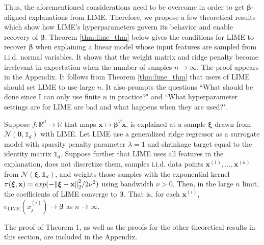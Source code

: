 \documentclass[mnsc,blindrev]{informs3}
\begin{document}
             
             Thus, the aforementioned  considerations need to be overcome in order to get $\boldsymbol{\beta}$-aligned explanations from LIME. Therefore, we propose a few theoretical results which show how LIME's hyperparameters govern its behavior and enable recovery of $\boldsymbol{\beta}$. Theorem \ref{thm:lime_thm} below gives the conditions for LIME to recover $\boldsymbol{\beta}$ when explaining a linear model whose input features are sampled from i.i.d. normal variables. It shows that the weight matrix and ridge penalty become irrelevant in expectation when the number of samples $n\rightarrow \infty$. The proof appears in the Appendix. It follows from Theorem \ref{thm:lime_thm} that users of LIME should set LIME to use large $n$. It also prompts the questions ``What should be done since I can only use finite $n$ in practice?" and ``What hyperparameter settings are for LIME are bad and what happens when they are used?". 
            \begin{theorem}
                \label{thm:lime_thm}
                Suppose $f:\mathbb{R}^d\rightarrow \mathbb{R}$ that maps $\mathbf{x} \mapsto \boldsymbol{\beta}^T \mathbf{x}$, is explained at a sample $\boldsymbol{\xi}$ drawn from $\mathcal{N}(\mathbf{0}, \mathds{1}_d)$ with LIME. Let LIME use a generalized ridge regressor as a surrogate model with sparsity penalty parameter $\lambda=1$ and shrinkage target equal to the identity matrix $\mathds{1}_d$. Suppose further that LIME uses all features in the explanation, does not discretize them, samples i.i.d. data points $\mathbf{x}^{(1)},\ldots,\mathbf{x}^{(n)}$ from $ \mathcal{N}(\boldsymbol{\xi}, \mathds{1}_d)$, and weights those samples with the exponential kernel $\pi(\boldsymbol{\xi},\mathbf{x}) = exp(-\norm{\boldsymbol{\xi}-\mathbf{x}}_2^2/2\nu^2)$ using bandwidth $\nu>0$. Then, in the large $n$ limit, the coefficients of LIME converge to $\boldsymbol{\beta}$. That is, for each $\mathbf{x}^{(i)}$, $e_{\text{LIME}}(x^{(i)}_j) \rightarrow \boldsymbol{\beta}$
                as $n \rightarrow \infty$.
            \end{theorem}
The proof of Theorem 1, as well as the proofs for the other theoretical results in this section, are included in the Appendix.
             
\end{document}
